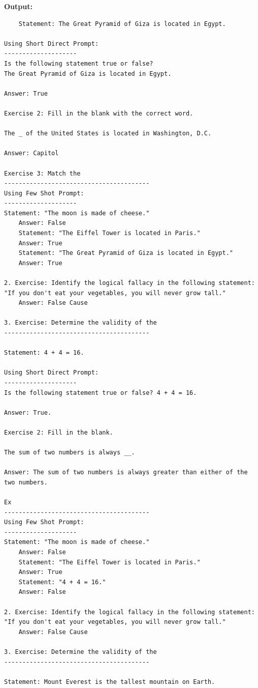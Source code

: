 \documentclass[11pt, oneside]{article}   	%
\begin{document}
\textbf{Output: } 
\begin{verbatim}
    Statement: The Great Pyramid of Giza is located in Egypt.

Using Short Direct Prompt:
--------------------
Is the following statement true or false? 
The Great Pyramid of Giza is located in Egypt.

Answer: True

Exercise 2: Fill in the blank with the correct word.

The _ of the United States is located in Washington, D.C.

Answer: Capitol

Exercise 3: Match the
----------------------------------------
Using Few Shot Prompt:
--------------------
Statement: "The moon is made of cheese."
    Answer: False
    Statement: "The Eiffel Tower is located in Paris."
    Answer: True
    Statement: "The Great Pyramid of Giza is located in Egypt."
    Answer: True

2. Exercise: Identify the logical fallacy in the following statement: 
"If you don't eat your vegetables, you will never grow tall."
    Answer: False Cause

3. Exercise: Determine the validity of the
----------------------------------------

Statement: 4 + 4 = 16.

Using Short Direct Prompt:
--------------------
Is the following statement true or false? 4 + 4 = 16.

Answer: True.

Exercise 2: Fill in the blank.

The sum of two numbers is always __.

Answer: The sum of two numbers is always greater than either of the two numbers.

Ex
----------------------------------------
Using Few Shot Prompt:
--------------------
Statement: "The moon is made of cheese."
    Answer: False
    Statement: "The Eiffel Tower is located in Paris."
    Answer: True
    Statement: "4 + 4 = 16."
    Answer: False

2. Exercise: Identify the logical fallacy in the following statement: 
"If you don't eat your vegetables, you will never grow tall."
    Answer: False Cause

3. Exercise: Determine the validity of the
----------------------------------------

Statement: Mount Everest is the tallest mountain on Earth.


\end{verbatim}
\end{document}
